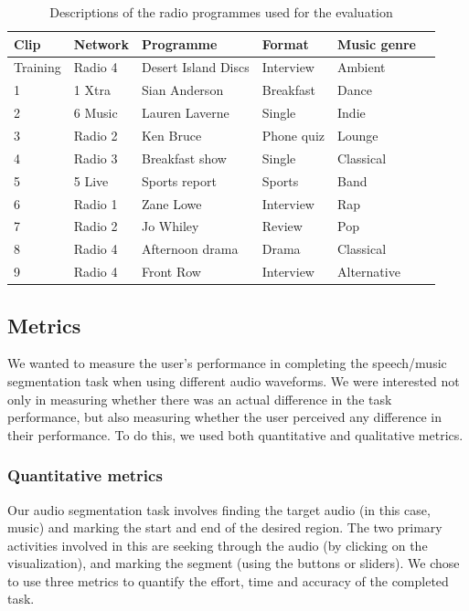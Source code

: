 \begin{table}[htbp]
  \begin{center}
    {\small
    \begin{tabular}{l l l l l l}
      \hline
      \textbf{Clip} & \textbf{Network} & \textbf{Programme} & \textbf{Format} & \textbf{Music genre} \\ \hline
      Training & Radio 4 & Desert Island Discs & Interview & Ambient \\
      1 & 1 Xtra & Sian Anderson & Breakfast & Dance \\
      2 & 6 Music & Lauren Laverne & Single & Indie \\
      3 & Radio 2 & Ken Bruce & Phone quiz & Lounge \\
      4 & Radio 3 & Breakfast show & Single & Classical \\
      5 & 5 Live & Sports report & Sports & Band \\
      6 & Radio 1 & Zane Lowe & Interview & Rap \\
      7 & Radio 2 & Jo Whiley & Review & Pop \\
      8 & Radio 4 & Afternoon drama & Drama & Classical \\
      9 & Radio 4 & Front Row & Interview & Alternative \\ \hline
    \end{tabular}
  }
  \end{center}
  \caption{Descriptions of the radio programmes used for the evaluation}
  \label{tab:clips}
\end{table}

\subsection{Metrics}

We wanted to measure the user's performance in completing the speech/music segmentation task when using different audio
waveforms. We were interested not only in measuring whether there was an actual difference in the task performance, but
also measuring whether the user perceived any difference in their performance.  To do this, we used both quantitative
and qualitative metrics.

\subsubsection{Quantitative metrics}
Our audio segmentation task involves finding the target audio (in this case, music) and marking the start and end of
the desired region. The two primary activities involved in this are seeking through the audio (by clicking on the
visualization), and marking the segment (using the buttons or sliders).  We chose to use three metrics to quantify the
effort, time and accuracy of the completed task.

